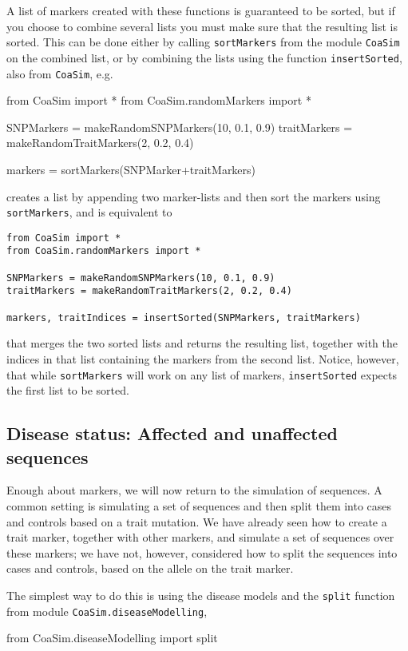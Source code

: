 \documentclass{manual}
\begin{document}
\begin{empfile}
A list of markers created with these functions is guaranteed to be
sorted, but if you choose to combine several lists you must make sure
that the resulting list is sorted.  This can be done either by calling
\texttt{sortMarkers} from the module \texttt{CoaSim} on the combined
list, or by combining the lists using the function
\texttt{insertSorted}, also from \texttt{CoaSim}, e.g.\
\begin{code}
from CoaSim import *
from CoaSim.randomMarkers import *

SNPMarkers = makeRandomSNPMarkers(10, 0.1, 0.9)
traitMarkers = makeRandomTraitMarkers(2, 0.2, 0.4)

markers = sortMarkers(SNPMarker+traitMarkers)
\end{code}
creates a list by appending two marker-lists and then sort the markers
using \texttt{sortMarkers}, and is equivalent to
\begin{lstlisting}
from CoaSim import *
from CoaSim.randomMarkers import *

SNPMarkers = makeRandomSNPMarkers(10, 0.1, 0.9)
traitMarkers = makeRandomTraitMarkers(2, 0.2, 0.4)

markers, traitIndices = insertSorted(SNPMarkers, traitMarkers)
\end{lstlisting}
that merges the two sorted lists and returns the resulting list,
together with the indices in that list containing the markers from the
second list.  Notice, however, that while \texttt{sortMarkers} will
work on any list of markers, \texttt{insertSorted} expects the first
list to be sorted.

\subsection{Disease status: Affected and unaffected sequences}
\label{sec:cases-controls}

Enough about markers, we will now return to the simulation of
sequences.  A common setting is simulating a set of sequences and then
split them into cases and controls based on a trait mutation.  We have
already seen how to create a trait marker, together with other
markers, and simulate a set of sequences over these markers; we have
not, however, considered how to split the sequences into cases and
controls, based on the allele on the trait marker.

The simplest way to do this is using the disease models and the
\texttt{split} function from module \texttt{CoaSim.diseaseModelling},
\begin{code}
from CoaSim.diseaseModelling import split


\end{code}
\end{empfile}
\end{document}
